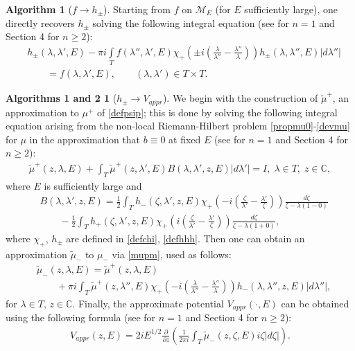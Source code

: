 \documentclass[11pt,a4paper,english,subeqn]{amsart}
\theoremstyle{plain}
\theoremstyle{definition}
\newtheorem{algo}{Algorithm}
\newtheorem*{algos}{Algorithms 1 and 2}
\numberwithin{equation}{section}
\begin{document}
\begin{algo}[$f \longrightarrow h_{\pm}$]
Starting from $f$ on ${\mathscr{M}_E}$ (for $E$ sufficiently large), one directly recovers $h_{\pm}$ solving the following integral equation (see \cite{N2, N4} for $n=1$ and Section 4 for $n \geq 2$):
\begin{align} \label{hpmf}
&h_{\pm}(\lambda,\lambda',E)-\pi i \int\limits_T   f(\lambda'',\lambda',E) \chi_+\left(\pm i \left(\frac{\lambda}{\lambda''}-\frac{\lambda''}{\lambda} \right) \right) h_{\pm}(\lambda, \lambda'',E)   |d \lambda''| \\ \nonumber
&\qquad = f(\lambda,\lambda',E), \qquad (\lambda,\lambda') \in T \times T.
\end{align}
\end{algo}

\begin{algos}[$h_{\pm} \longrightarrow V_{appr}$]
We begin with the construction of $\tilde \mu^+$, an approximation to $\mu^+$ of \eqref{defpsip}; this is done by solving the following integral equation arising from the non-local Riemann-Hilbert problem \eqref{propmu0}-\eqref{devmu} for $\mu$ in the approximation that $b \equiv 0$ at fixed $E$ (see \cite{N4} for $n=1$ and Section 4 for $n \geq 2$):
\begin{align} \label{mupapp}
\tilde \mu^+(z,\lambda,E) +\int_T \tilde \mu^+(z,\lambda',E) B(\lambda,\lambda',z,E)  |d\lambda'| =I, \; \lambda \in T, \; z \in {\mathbb{C}},
\end{align}
where $E$ is sufficiently large and
\begin{align} \label{defB}
&B(\lambda,\lambda', z,E)= \frac 1 2 \int_T h_-(\zeta,\lambda',z,E) \chi_+\left(-i \left(\frac{\zeta}{\lambda'}-\frac{\lambda'}{\zeta}\right) \right) \frac{d\zeta}{\zeta-\lambda(1-0)} \\ \nonumber
&\qquad - \frac 1 2 \int_T h_+(\zeta,\lambda',z,E) \chi_+\left(i \left(\frac{\zeta}{\lambda'} -\frac{\lambda'}{\zeta}\right) \right) \frac{d\zeta}{\zeta-\lambda(1+0)},
\end{align}
where $\chi_+$, $h_{\pm}$ are defined in \eqref{defchi}, \eqref{defhhh}.
Then one can obtain an approximation $\tilde \mu_{-}$ to $\mu_-$ via \eqref{mupm}, used as follows:
\begin{align} \label{recmum}
&\tilde \mu_{-}(z,\lambda,E) = \tilde \mu^+(z,\lambda,E) \\ \nonumber
&\qquad + \pi i \int_T \tilde \mu^+(z,\lambda'',E)  \chi_+ \left(- i \left(\frac{\lambda}{\lambda''} - \frac{\lambda''}{\lambda} \right) \right) h_{-}(\lambda, \lambda'',z,E)  |d\lambda''|,
\end{align}
for $\lambda \in T$, $z \in {\mathbb{C}}$. Finally, the approximate potential $V_{appr}(\cdot, E)$ can be obtained using the following formula (see \cite{N3,N4} for $n=1$ and Section 4 for $n \geq 2$):
\begin{align} \label{fvapp}
V_{appr}(z,E)= 2 i E^{1/2} \frac{\partial}{\partial z} \left( \frac{1}{2 \pi i} \int_T \tilde \mu_-(z,\zeta,E) i\zeta |d \zeta | \right).
\end{align}
\end{algos}
\end{document}
